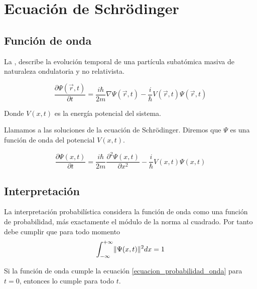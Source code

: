 \chapter{Ecuación de Schrödinger}


\section{Función de onda}
La , describe la evolución temporal de una partícula subatómica masiva de naturaleza ondulatoria y no relativista.
\begin{postulate}
    \begin{equation}
    \label{eq:ecuacion_schrodinger}
    \frac{\partial\Psi(\vec{r},t)}{\partial t}=\frac{i\hbar}{2m}\nabla\Psi(\vec{r},t)-\frac{i}{\hbar}V(\vec{r},t)\Psi(\vec{r},t)
    \end{equation}
\end{postulate}

Donde $V(x,t)$ es la energía potencial del sistema.

Llamamos  a las soluciones de la ecuación de Schrödinger. Diremos que $\Psi$ es una función de onda del potencial $V(x,t)$.

\begin{postulate}
    \begin{equation}
        \label{eq:ecuacion_schrodinger_una_dimension}
        \frac{\partial\Psi(x,t)}{\partial t}=\frac{i\hbar}{2m}\frac{\partial^2\Psi(x,t)}{\partial x^2}-\frac{i}{\hbar}V(x,t)\Psi(x,t)
    \end{equation}
\end{postulate}

\section{Interpretación}
La interpretación probabilística considera la función de onda como una función de probabilidad, más exactamente el módulo de la norma al cuadrado. Por tanto debe cumplir que para todo momento
\begin{equation}
    \label{ecuacion_probabilidad_onda}
    \int_{-\infty}^{+\infty}\lVert\Psi(x,t)\rVert^2 dx=1
\end{equation}
\begin{resultado}
    Si la función de onda cumple la ecuación \ref{ecuacion_probabilidad_onda} para $t=0$, entonces lo cumple para todo $t$.
\end{resultado}

